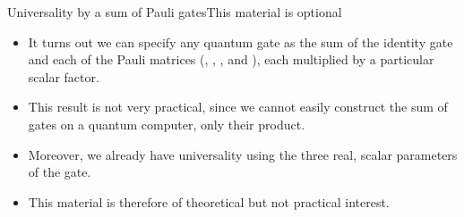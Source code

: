\begin{frame}{Universality by a sum of Pauli gates}{This material is optional}
\begin{itemize}
    \item It turns out we can specify any quantum gate as the sum of the identity gate and each of the Pauli matrices (\Identity{}, \PauliX{}, \PauliY{}, and \PauliZ{}), each multiplied by a particular scalar factor. 
    \item This result is not very practical, since we cannot easily construct the sum of gates on a quantum computer, only their product.
    \item Moreover, we already have universality using the three real, scalar parameters of the  gate.
    \item This material is therefore of theoretical but not practical interest.
\end{itemize}
    
\end{frame}


